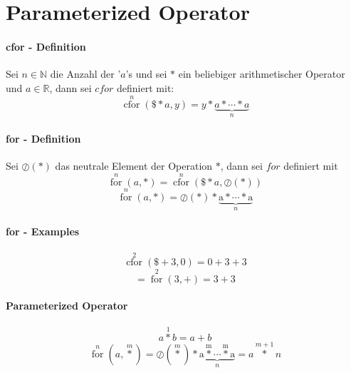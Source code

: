 \documentclass{article}
\begin{document}
\section{Parameterized Operator}
\paragraph{cfor - Definition \newline}

Sei $n \in \mathbb{N}$ die Anzahl der '$a$'s und sei $\ast$ ein beliebiger arithmetischer Operator und $a \in \mathbb{R}$, dann sei $cfor$ definiert mit:
\[ \operatorname*{cfor}^{n}\left(\$\ast a,y\right) = y\ast\underbrace{a\ast\dotsb\ast a}_{n} \]

\paragraph{for - Definition \newline}
Sei $\oslash\left(\ast\right)$ das neutrale Element der Operation $\ast$, dann sei $for$ definiert mit
\[ \operatorname*{for}^{n}\left(a,\ast \right) = \operatorname*{cfor}^{n}\left(\$\ast a,\oslash\left(\ast\right)\right)\]
\[ \operatorname*{for}^n \left(a, \ast \right) = \oslash\left(\ast\right) \ast \operatorname*{\underbrace{a \ast \dotsb \ast a}}_{n} \]

\paragraph{for - Examples}

\[ \operatorname*{cfor}^{2}\left(\$+3,0\right) = 0+3+3 \]
\[ = \operatorname*{for}^{2}\left(3,+\right) = 3+3 \]

\paragraph{Parameterized Operator}
\[ a \operatorname*{\ast}^1 b = a + b \]
\[ \operatorname*{for}^{n}\left(a,\operatorname*{\ast}^m\right) = \oslash\left(\operatorname*{\ast}^m \right) \ast \operatorname*{\underbrace{a \operatorname*{\ast}^m \dotsb \operatorname*{\ast}^m a}}_n = a\operatorname*{\ast}^{m+1}n\]
\end{document}
